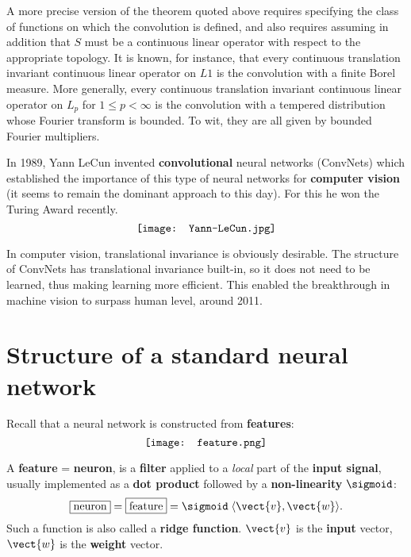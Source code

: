 \begin{tcolorbox}[breakable]
A more precise version of the theorem quoted above requires specifying the class of functions on which the convolution is defined, and also requires assuming in addition that $S$ must be a continuous linear operator with respect to the appropriate topology. It is known, for instance, that every continuous translation invariant continuous linear operator on $L1$ is the convolution with a finite Borel measure. More generally, every continuous translation invariant continuous linear operator on $L_p$ for $1 \le p < \infty$ is the convolution with a tempered distribution whose Fourier transform is bounded.  To wit, they are all given by bounded Fourier multipliers.
\end{tcolorbox}

In 1989, Yann LeCun invented \textbf{convolutional} neural networks (ConvNets) which established the importance of this type of neural networks for \textbf{computer vision} (it seems to remain the dominant approach to this day).  For this he won the Turing Award recently.
\begin{equation}
\nonumber
\vcenter{\hbox{\texttt{[image: Yann-LeCun.jpg]}}}
\end{equation}

In computer vision, translational invariance is obviously desirable.  The structure of ConvNets has translational invariance built-in, so it does not need to be learned, thus making learning more efficient.  This enabled the breakthrough in machine vision to surpass human level, around 2011.

\section{Structure of a standard neural network}

Recall that a neural network is constructed from \textbf{features}:
\begin{equation}
\vcenter{\hbox{\texttt{[image: feature.png]}}}
\end{equation}

A \textbf{feature} = \textbf{neuron}, is a \textbf{filter} applied to a \textit{local} part of the \textbf{input signal}, usually implemented as a \textbf{dot product} followed by a \textbf{non-linearity} $\sigmoid$:
\begin{equation}
\boxed{\mbox{neuron}} = \boxed{\mbox{feature}} = \sigmoid \; \langle \vect{v}, \vect{w} \rangle .
\end{equation}
Such a function is also called a \textbf{ridge function}.  $\vect{v}$ is the \textbf{input} vector, $\vect{w}$ is the \textbf{weight} vector.

